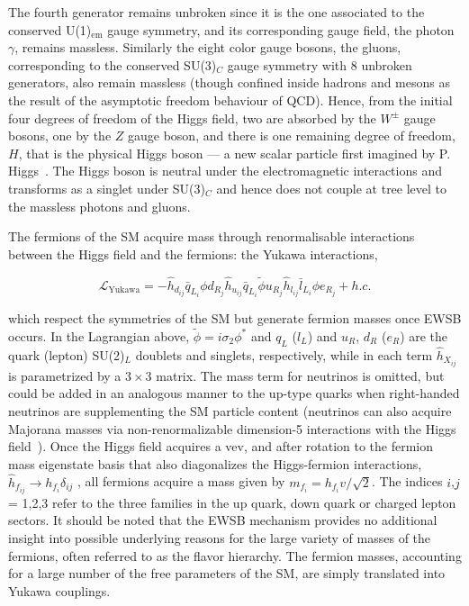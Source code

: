 \documentclass[12pt]{article}
\begin{document}
The fourth generator remains unbroken since it is the one associated to the conserved U(1)$_\text{em}$ gauge symmetry, and its corresponding gauge field, the photon $\gamma$, remains massless. Similarly the eight color gauge bosons, the gluons, corresponding to the conserved SU(3)$_C$ gauge symmetry with 8 unbroken generators, also remain massless (though confined inside hadrons and mesons as the result of the asymptotic freedom behaviour of QCD). Hence, from the initial four degrees of freedom of the Higgs field, two are absorbed by the $W^\pm$ gauge bosons, one by the $Z$ gauge boson, and there is one remaining degree of freedom, $H$, that is the physical Higgs boson — a new scalar particle first imagined by P. Higgs~\cite{PhysRevLett.13.321,PhysRev.145.1156}. The Higgs boson is neutral under the electromagnetic interactions and transforms as a singlet under SU(3)$_C$ and hence does not couple at tree level to the massless photons and gluons.

The fermions of the SM acquire mass through renormalisable interactions between the Higgs field and the fermions: the Yukawa interactions,

\begin{equation}
    \mathcal{L}_\text{Yukawa} = -\hat{h}_{d_{ij}} \bar{q}_{L_i}\phi d_{R_j} \hat{h}_{u_{ij}} \bar{q}_{L_i}\tilde{\phi} u_{R_j} \hat{h}_{l_{ij}} \bar{l}_{L_i}\phi e_{R_j} + h.c.
\end{equation}

which respect the symmetries of the SM but generate fermion
masses once EWSB occurs. In the Lagrangian above, $\tilde{\phi} = i\sigma_2\phi^*$ and $q_L$ ($l_L$) and $u_R$, $d_R$ ($e_R$) are the quark (lepton) SU(2)$_L$ doublets and singlets, respectively, while in each term $\hat{h}_{X_{ij}}$ is parametrized by a $3\times3$ matrix. The mass term for neutrinos is omitted, but could be added in an analogous manner to the up-type quarks when right-handed neutrinos are supplementing the SM particle content (neutrinos can also acquire Majorana masses via non-renormalizable dimension-5 interactions with the Higgs field~\cite{Weinberg:1979sa}). Once the Higgs field acquires a vev, and after rotation to the fermion mass eigenstate basis that also diagonalizes the Higgs-fermion interactions, $\hat{h}_{f_{ij}} \rightarrow h_{f_i} \delta_{ij}$ , all fermions acquire a mass given by $m_{f_i} = h_{f_{i}} v/\sqrt{2}$. The indices $i$,$j$ = 1,2,3 refer to the three families in the up quark, down quark or charged lepton sectors. It should be noted that the EWSB mechanism provides no additional insight into possible underlying reasons for the large variety of masses of the fermions, often referred to as the flavor hierarchy. The fermion masses, accounting for a large number of the free parameters of the SM, are simply translated into Yukawa couplings.



\end{document}
